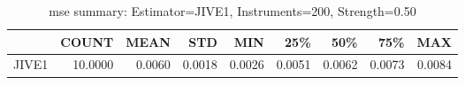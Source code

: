 \begin{table}[ht]
\centering
\caption{mse summary: Estimator=JIVE1, Instruments=200, Strength=0.50}
\begin{tabular}{lrrrrrrrr}
\toprule
 & COUNT & MEAN & STD & MIN & 25\% & 50\% & 75\% & MAX \\
\midrule
JIVE1 & 10.0000 & 0.0060 & 0.0018 & 0.0026 & 0.0051 & 0.0062 & 0.0073 & 0.0084 \\
\bottomrule
\end{tabular}
\end{table}
